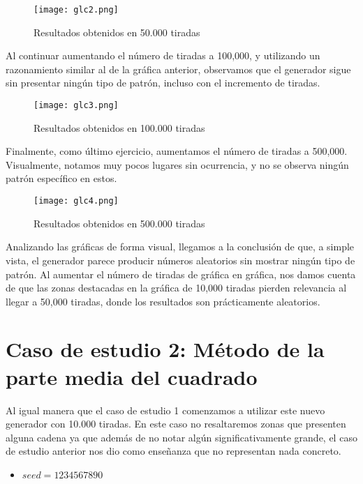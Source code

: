 \documentclass{article}
\begin{document}
\begin{figure}[H]
    \centering
    \texttt{[image: glc2.png]}
    \caption{Resultados obtenidos en 50.000 tiradas}
    \label{fig:glc-50000}
\end{figure}

Al continuar aumentando el número de tiradas a 100,000, y utilizando un razonamiento similar al de la gráfica anterior, observamos que el generador sigue sin presentar ningún tipo de patrón, incluso con el incremento de tiradas.

\begin{figure}[H]
    \centering
    \texttt{[image: glc3.png]}
    \caption{Resultados obtenidos en 100.000 tiradas}
    \label{fig:glc-100000}
\end{figure}

Finalmente, como último ejercicio, aumentamos el número de tiradas a 500,000. Visualmente, notamos muy pocos lugares sin ocurrencia, y no se observa ningún patrón específico en estos.

\begin{figure}[H]
    \centering
    \texttt{[image: glc4.png]}
    \caption{Resultados obtenidos en 500.000 tiradas}
    \label{fig:glc-500000}
\end{figure}

Analizando las gráficas de forma visual, llegamos a la conclusión de que, a simple vista, el generador parece producir números aleatorios sin mostrar ningún tipo de patrón. Al aumentar el número de tiradas de gráfica en gráfica, nos damos cuenta de que las zonas destacadas en la gráfica de 10,000 tiradas pierden relevancia al llegar a 50,000 tiradas, donde los resultados son prácticamente aleatorios.

\section{Caso de estudio 2: Método de la parte media del cuadrado}

Al igual manera que el caso de estudio 1 comenzamos a utilizar este nuevo generador con 10.000 tiradas. En este caso no resaltaremos zonas que presenten alguna cadena ya que además de no notar algún significativamente grande, el caso de estudio anterior nos dio como enseñanza que no representan nada concreto.
\begin{itemize}
    \item $seed = 1234567890$
\end{itemize}
\end{document}
